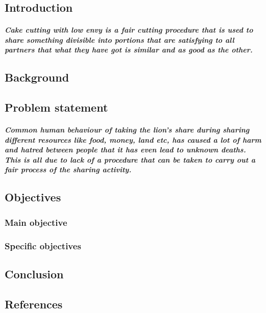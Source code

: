 \documentclass[12pt]{report}
\title{\textb{CAKE CUTTING WITH LOW ENVY}}
\author{	MPUUGA FAIZO, TUZA JOHN, KAMIGISHA KEITH, NAMUTEBI JAMILLAH MAGO}
\begin{document}
\maketitle
\chapter{}
\section{Introduction} 
\paragraph{Cake cutting with low envy is a fair cutting procedure that is used to share something divisible into portions that are satisfying to all partners that what they have got is similar and as good as the other. }


\section{Background}
\section{Problem statement}
\paragraph{Common human behaviour of taking the lion's share during sharing different resources like food, money, land etc, has caused a lot of harm and hatred between people that it has even lead to unknown deaths. This is all due to lack of a procedure that can be taken to carry out a fair process of the sharing activity. }
\section{Objectives}
\subsection{Main objective}
\subsection{Specific objectives}
\section{Conclusion}
\section{References}
\end{document}
